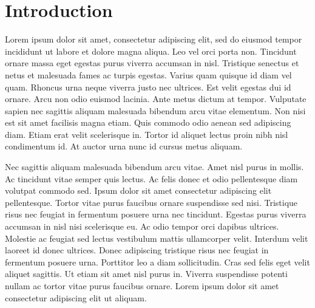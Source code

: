 \chapter{Introduction}

Lorem ipsum dolor sit amet, consectetur adipiscing elit, sed do eiusmod tempor incididunt ut labore et dolore magna aliqua. Leo vel orci porta non. Tincidunt ornare massa eget egestas purus viverra accumsan in nisl. Tristique senectus et netus et malesuada fames ac turpis egestas. Varius quam quisque id diam vel quam. Rhoncus urna neque viverra justo nec ultrices. Est velit egestas dui id ornare. Arcu non odio euismod lacinia. Ante metus dictum at tempor. Vulputate sapien nec sagittis aliquam malesuada bibendum arcu vitae elementum. Non nisi est sit amet facilisis magna etiam. Quis commodo odio aenean sed adipiscing diam. Etiam erat velit scelerisque in. Tortor id aliquet lectus proin nibh nisl condimentum id. At auctor urna nunc id cursus metus aliquam.

Nec sagittis aliquam malesuada bibendum arcu vitae. Amet nisl purus in mollis. Ac tincidunt vitae semper quis lectus. Ac felis donec et odio pellentesque diam volutpat commodo sed. Ipsum dolor sit amet consectetur adipiscing elit pellentesque. Tortor vitae purus faucibus ornare suspendisse sed nisi. Tristique risus nec feugiat in fermentum posuere urna nec tincidunt. Egestas purus viverra accumsan in nisl nisi scelerisque eu. Ac odio tempor orci dapibus ultrices. Molestie ac feugiat sed lectus vestibulum mattis ullamcorper velit. Interdum velit laoreet id donec ultrices. Donec adipiscing tristique risus nec feugiat in fermentum posuere urna. Porttitor leo a diam sollicitudin. Cras sed felis eget velit aliquet sagittis. Ut etiam sit amet nisl purus in. Viverra suspendisse potenti nullam ac tortor vitae purus faucibus ornare. Lorem ipsum dolor sit amet consectetur adipiscing elit ut aliquam.

